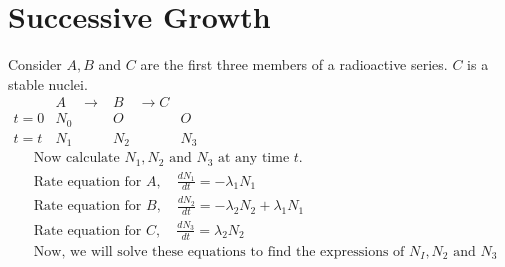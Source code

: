 \section{Successive Growth}
Consider $A,B$ and $C$ are the first three members of a radioactive series. $C$ is a stable nuclei.\\
$\begin{array}{llll}  
&A\quad \longrightarrow & B\quad  \longrightarrow C  \\ 
t=0 & N_0 & O & O  \\ 
t=t & N_1 & N_2 & N_3\end{array}$
\begin{align*}
&\text{Now calculate $N_1, N_2$ and $N_3$ at any time $t$.}\\
&\text{Rate equation for $A, \quad \frac{d N_1}{d t}=-\lambda_1 N_1$}\\
&\text{Rate equation for $B, \quad \frac{d N_2}{d t}=-\lambda_2 N_2+\lambda_1 N_1$}\\
&\text{Rate equation for $C, \quad \frac{d N_3}{d t}=\lambda_2 N_2$}\\
&\text{Now, we will solve these equations to find the expressions of $N_I, N_2$ and $N_3$}
\end{align*}
